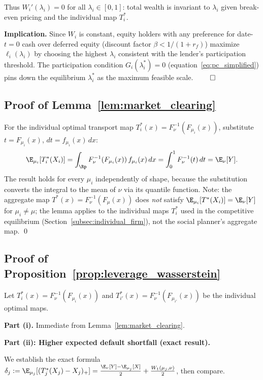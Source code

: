Thus $W_i'(\lambda_i) = 0$ for all $\lambda_i \in [0,1]$: total wealth is invariant to $\lambda_i$ given break-even pricing and the individual map $T_i^*$.

\textbf{Implication.} Since $W_i$ is constant, equity holders with any preference for date-$t=0$ cash over deferred equity (discount factor $\beta < 1/(1+r_f)$) maximize $\ell_i(\lambda_i)$ by choosing the highest $\lambda_i$ consistent with the lender's participation threshold. The participation condition $G_i(\lambda_i^*) = 0$ (equation~\eqref{eq:pc_simplified}) pins down the equilibrium $\lambda_i^*$ as the maximum feasible scale. $\qed$

\subsection*{Proof of Lemma~\ref{lem:market_clearing}}

For the individual optimal transport map $T_i^*(x) = F_\nu^{-1}(F_{\mu_i}(x))$, substitute $t = F_{\mu_i}(x)$, $dt = f_{\mu_i}(x)\,dx$:
\[
  \E_{\mu_i}[T_i^*(X_i)] = \int_{\Rp} F_\nu^{-1}(F_{\mu_i}(x))\,f_{\mu_i}(x)\,dx = \int_0^1 F_\nu^{-1}(t)\,dt = \E_\nu[Y].
\]
The result holds for every $\mu_i$ independently of shape, because the substitution converts the integral to the mean of $\nu$ via its quantile function. Note: the aggregate map $T^*(x) = F_\nu^{-1}(F_\mu(x))$ does \emph{not} satisfy $\E_{\mu_i}[T^*(X_i)] = \E_\nu[Y]$ for $\mu_i \neq \mu$; the lemma applies to the individual maps $T_i^*$ used in the competitive equilibrium (Section~\ref{subsec:individual_firm}), not the social planner's aggregate map. \qed

\subsection*{Proof of Proposition~\ref{prop:leverage_wasserstein}}

Let $T_i^*(x) = F_\nu^{-1}(F_{\mu_i}(x))$ and $T_{i'}^*(x) = F_\nu^{-1}(F_{\mu_{i'}}(x))$ be the individual optimal maps.

\textbf{Part (i).} Immediate from Lemma~\ref{lem:market_clearing}.

\textbf{Part (ii): Higher expected default shortfall (exact result).}

We establish the exact formula $\delta_j := \E_{\mu_j}[(T_j^*(X_j)-X_j)_+] = \frac{\E_\nu[Y]-\E_{\mu_j}[X]}{2} + \frac{W_1(\mu_j,\nu)}{2}$, then compare.

